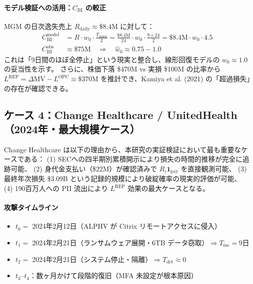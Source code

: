 \documentclass[a4paper,11pt]{article}
\newcommand{\ind}{\mathbf{1}}
\theoremstyle{definition}
\begin{document}
\paragraph{モデル検証への活用：$C_{\mathrm{BI}}$ の較正}

MGM の日次逸失売上 $R_{\mathrm{daily}} \approx \$8.4$M に対して：
\begin{align}
  C_{\mathrm{BI}}^{\mathrm{model}} &= R \cdot w_0 \cdot \frac{T_{\mathrm{down}}}{2}
  = \frac{\$8.4\mathrm{M}}{24} \cdot w_0 \cdot \frac{9 \times 24}{2}
  = \$8.4\mathrm{M} \cdot w_0 \cdot 4.5 \\
  C_{\mathrm{BI}}^{\mathrm{obs}} &\approx \$75\mathrm{M}
  \quad\Rightarrow\quad \hat{w}_0 \approx 0.75 - 1.0
\end{align}
これは「9日間のほぼ全停止」という現実と整合し、線形回復モデルの $w_0 \approx 1.0$ の妥当性を示す。
さらに、株価下落 \$470M vs 実損 \$100M の比率から
$L^{\mathrm{REP}} = \Delta\mathrm{MV} - L^{\mathrm{OPC}} \approx \$370\mathrm{M}$
を推計でき、Kamiya et al. (2021) の「超過損失」の存在が確認できる。

\subsection{ケース 4：Change Healthcare / UnitedHealth（2024年・最大規模ケース）}

\begin{tcolorbox}[strategybox, title={最重要実証ケース}]
  Change Healthcare は以下の理由から、本研究の実証検証において最も重要なケースである：
  (1) SECへの四半期別累積開示により損失の時間的推移が完全に追跡可能、
  (2) 身代金支払い（\$22M）が確認済みで $R_i\ind_{\mathrm{pay}}$ を直接観測可能、
  (3) 最終年次損失 \$3.09B という記録的規模により破綻確率の現実的評価が可能、
  (4) 190百万人への PII 流出により $L^{\mathrm{REP}}$ 効果の最大ケースとなる。
\end{tcolorbox}

\paragraph{攻撃タイムライン}
\begin{itemize}[leftmargin=1.5em, itemsep=2pt]
  \item $t_0 = $ 2024年2月12日（ALPHV が Citrix リモートアクセスに侵入）
  \item $t_1 = $ 2024年2月21日（ランサムウェア展開・6TB データ窃取）$\Rightarrow T_{\mathrm{inc}} = 9$日
  \item $t_2 = $ 2024年2月21日（システム停止・隔離）$\Rightarrow T_{\mathrm{det}} \approx 0$
  \item $t_3$--$t_4$：数ヶ月かけて段階的復旧（MFA 未設定が根本原因）
\end{itemize}
\end{document}
